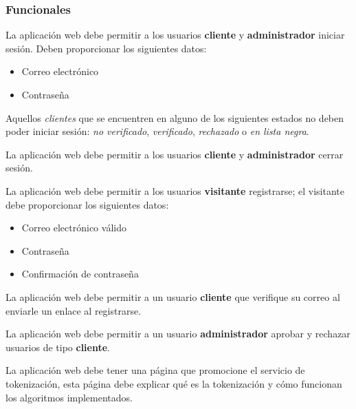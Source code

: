 %
%

\subsubsection{Funcionales}

{
  La aplicación web debe permitir a los usuarios \textbf{cliente} y
  \textbf{administrador} iniciar sesión. Deben proporcionar los siguientes
  datos:
  \begin{itemize}
    \item Correo electrónico
    \item Contraseña
  \end{itemize}

  \begin{hangparas}{2em}{0}
    {
      Aquellos \textit{clientes} que se encuentren en alguno de los siguientes
      estados no deben poder iniciar sesión: \textit{no verificado},
      \textit{verificado}, \textit{rechazado} o \textit{en lista negra}.
    }
  \end{hangparas}
}

{
  La aplicación web debe permitir a los usuarios \textbf{cliente} y
  \textbf{administrador} cerrar sesión.
}

{
  La aplicación web debe permitir a los usuarios \textbf{visitante}
  registrarse; el visitante debe proporcionar los siguientes datos:
  \begin{itemize}
    \item Correo electrónico válido
    \item Contraseña
    \item Confirmación de contraseña
  \end{itemize}
}

{
  La aplicación web debe permitir a un usuario \textbf{cliente} que verifique
  su correo al enviarle un enlace al registrarse.
}

{
  La aplicación web debe permitir a un usuario \textbf{administrador} aprobar
  y rechazar usuarios de tipo \textbf{cliente}.
}

{
  La aplicación web debe tener una página que promocione el servicio de
  tokenización, esta página debe explicar qué es la tokenización y cómo
  funcionan los algoritmos implementados.
}

